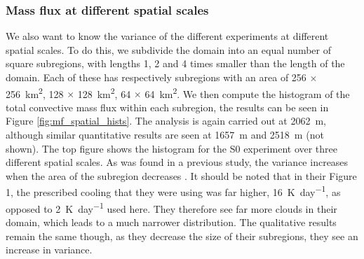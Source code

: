 \documentclass[11pt,a4paper]{article}
\newcommand\todo[1]{\textbf{TODO: #1}}
\begin{document}
%
\subsubsection{Mass flux at different spatial scales}
We also want to know the variance of the different experiments at different spatial scales. To do this, we subdivide the domain into an equal number of square subregions, with lengths 1, 2 and 4 times smaller than the length of the domain. Each of these has respectively subregions with an area of \SI{256}{} $\times$ \SI{256}{km^2}, \SI{128}{} $\times$ \SI{128}{km^2}, \SI{64}{} $\times$ \SI{64}{km^2}. We then compute the histogram of the total convective mass flux within each subregion, the results can be seen in Figure \ref{fig:mf_spatial_hists}. The analysis is again carried out at \SI{2062}{m}, although similar quantitative results are seen at \SI{1657}{m} and \SI{2518}{m} (not shown). The top figure shows the histogram for the S0 experiment over three different spatial scales. As was found in a previous study, the variance increases when the area of the subregion decreases \parencite{PC2008}. It should be noted that in their Figure 1, the prescribed cooling that they were using was far higher, \SI{16}{K.day^{-1}}, as opposed to \SI{2}{K.day^{-1}} used here. They therefore see far more clouds in their domain, which leads to a much narrower distribution. The qualitative results remain the same though, as they decrease the size of their subregions, they see an increase in variance.
\end{document}
